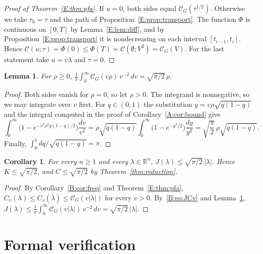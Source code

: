 \documentclass[11pt]{amsart}
\newtheorem{lemma}[theorem]{Lemma}
\newtheorem{corollary}[theorem]{Corollary}
\theoremstyle{remark}
\numberwithin{equation}{section}
\newcommand{\R}{\mathbb{R}}
\begin{document}
\begin{proof}[Proof of Theorem~\ref{E:thm:pfa}]
If $u=0$, both sides equal $\mathcal C_G(\tau^{1/2})$. Otherwise we take $\tau_0=\tau$ and the path of Proposition~\ref{E:prop:transport}. The function $\Phi$ is continuous on $[0,T]$ by Lemma~\ref{E:lem:diff}, and by Proposition~\ref{E:prop:transport} it is nondecreasing on each interval $[t_{i-1},t_i]$. Hence $\mathcal C(u;\tau)=\Phi(0)\le\Phi(T)=\mathcal C(\emptyset;V^2)=\mathcal C_G(V)$. For the last statement take $u=v\lambda$ and $\tau=0$.
\end{proof}

\begin{lemma}\label{E:lem:gauss}
For $\rho\ge0$, $\frac1\pi\int_0^\infty\mathcal C_G(v\rho)\,v^{-2}\,dv=\sqrt{\pi/2}\,\rho$.
\end{lemma}

\begin{proof}
Both sides vanish for $\rho=0$, so let $\rho>0$. The integrand is nonnegative, so we may integrate over $v$ first. For $q\in(0,1)$ the substitution $y=v\rho\sqrt{q(1-q)}$ and the integral computed in the proof of Corollary~\ref{A:cor:bound} give
\[
\int_0^\infty\bigl(1-e^{-v^2\rho^2q(1-q)/2}\bigr)\frac{dv}{v^2}=\rho\sqrt{q(1-q)}\int_0^\infty\bigl(1-e^{-y^2/2}\bigr)\frac{dy}{y^2}=\sqrt{\frac\pi2}\,\rho\sqrt{q(1-q)}.
\]
Finally, $\int_0^1dq/\sqrt{q(1-q)}=\pi$.
\end{proof}

\begin{corollary}\label{E:cor:main}
For every $n\ge1$ and every $\lambda\in\R^n$, $J(\lambda)\le\sqrt{\pi/2}\,|\lambda|$. Hence $K\le\sqrt{\pi/2}$, and $C\le\sqrt{\pi/2}$ by Theorem~\ref{thm:reduction}.
\end{corollary}

\begin{proof}
By Corollary~\ref{B:cor:freq} and Theorem~\ref{E:thm:pfa}, $C_v(\lambda)\le C_v(\bar\lambda)\le\mathcal C_G(v|\lambda|)$ for every $v>0$. By~\eqref{B:eq:JCv} and Lemma~\ref{E:lem:gauss}, $J(\lambda)\le\frac1\pi\int_0^\infty\mathcal C_G(v|\lambda|)\,v^{-2}\,dv=\sqrt{\pi/2}\,|\lambda|$.
\end{proof}

\section{Formal verification}\label{sec:lean}
\end{document}

